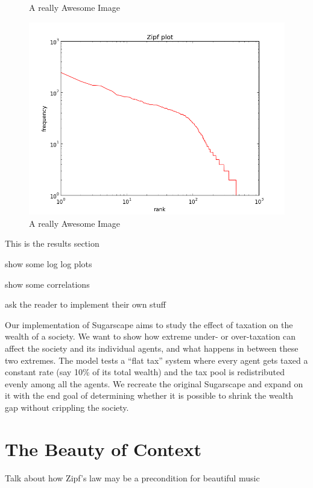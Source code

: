 \documentclass[10pt]{book}
\begin{document}
\begin{figure}[!htb]
  \caption{A really Awesome Image}\label{fig:awesome_image3}
\endminipage\hfill
{}%
  \includegraphics[width=\linewidth]{comf_notes_2}
  \caption{A really Awesome Image}\label{fig:awesome_image3}
\endminipage
\end{figure}





This is the results section

show some log log plots

show some correlations

ask the reader to implement their own stuff

Our implementation of Sugarscape aims to study the effect of taxation
on the wealth of a society. We want to show how extreme under- or
over-taxation can affect the society and its individual agents, and
what happens in between these two extremes. The model tests a ``flat
tax'' system where every agent gets taxed a constant rate (say 10\% of
its total wealth) and the tax pool is redistributed evenly among all
the agents. We recreate the original Sugarscape and expand on it with
the end goal of determining whether it is possible to shrink the wealth gap
without crippling the society.




\section{The Beauty of Context}

Talk about how Zipf's law may be a precondition for beautiful music
\end{document}
